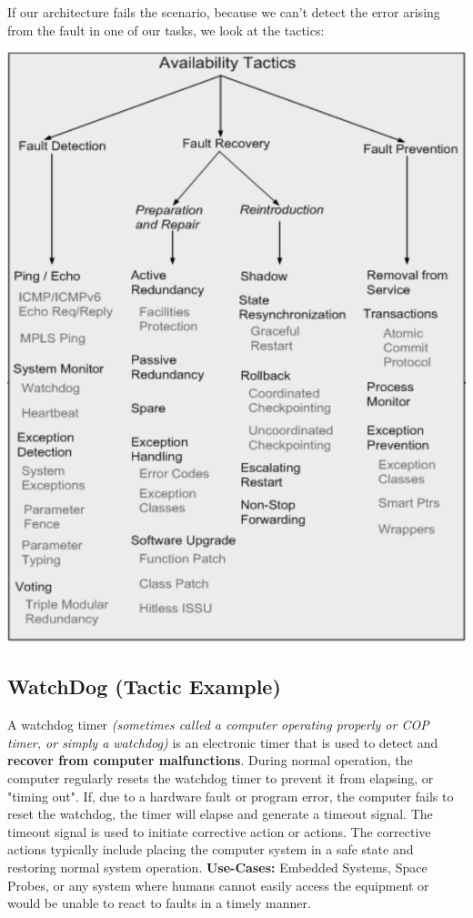 \documentclass[a4paper]{article}
\begin{document}
If our architecture fails the scenario, because we can't detect the error arising from the fault in one of our tasks, we look at the tactics:
\begin{center}
\includegraphics[scale=0.6]{images/abcdefg.png}
\end{center}

\subsection{WatchDog (Tactic Example)}
A watchdog timer \textit{(sometimes called a computer operating properly or COP timer, or simply a watchdog)} is an electronic timer that is used to detect and \textbf{recover from computer malfunctions}. During normal operation, the computer regularly resets the watchdog timer to prevent it from elapsing, or "timing out". If, due to a hardware fault or program error, the computer fails to reset the watchdog, the timer will elapse and generate a timeout signal. The timeout signal is used to initiate corrective action or actions. The corrective actions typically include placing the computer system in a safe state and restoring normal system operation.\newline
\textbf{Use-Cases: } Embedded Systems, Space Probes, or any system where humans cannot easily access the equipment or would be unable to react to faults in a timely manner.
\end{document}
